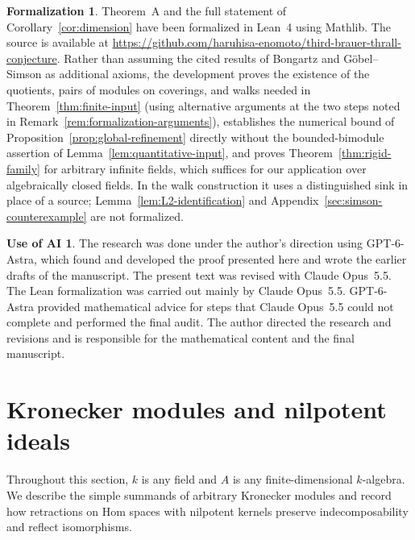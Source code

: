 \documentclass[a4paper,reqno,10pt]{amsart}
\theoremstyle{definition}
\newtheorem*{formalization}{Formalization}
\newtheorem*{aiuse}{Use of AI}
\numberwithin{equation}{section}
\begin{document}
\begin{formalization}
\def\UrlBreaks{\do\/\do\-\do\.}
Theorem~A and the full statement of Corollary~\ref{cor:dimension}
have been formalized in Lean~4 using Mathlib. The source is available at
\url{https://github.com/haruhisa-enomoto/third-brauer-thrall-conjecture}.
Rather than assuming the cited results of Bongartz and G\"obel--Simson as
additional axioms, the development proves the existence of the quotients,
pairs of modules on coverings, and walks needed in
Theorem~\ref{thm:finite-input} (using alternative arguments at the two
steps noted in Remark~\ref{rem:formalization-arguments}), establishes the
numerical bound of Proposition~\ref{prop:global-refinement} directly
without the bounded-bimodule assertion of
Lemma~\ref{lem:quantitative-input}, and proves
Theorem~\ref{thm:rigid-family} for arbitrary infinite fields, which
suffices for our application over algebraically closed fields. In the walk
construction it uses a distinguished sink in place of a source;
Lemma~\ref{lem:L2-identification} and
Appendix~\ref{sec:simson-counterexample} are not formalized.
\end{formalization}

\begin{aiuse}
The research was done under the author's direction using GPT-6-Astra,
which found and developed the proof presented here and wrote the earlier
drafts of the manuscript. The present text was revised with Claude
Opus~5.5. The Lean formalization was carried out mainly by Claude
Opus~5.5. GPT-6-Astra provided mathematical advice for steps that Claude
Opus~5.5 could not complete and performed the final audit.
The author directed the research and revisions and is
responsible for the mathematical content and the final manuscript.
\end{aiuse}

\section{Kronecker modules and nilpotent ideals}
\label{sec:extension}
Throughout this section, $k$ is any field and $A$ is any finite-dimensional
$k$-algebra. We describe the simple summands of arbitrary Kronecker
modules and record how retractions on Hom spaces with nilpotent kernels
preserve indecomposability and reflect isomorphisms.
\end{document}
